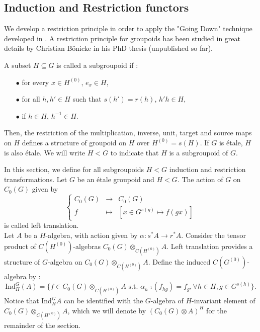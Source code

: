 \subsection{Induction and Restriction functors}

We develop a restriction principle in order to apply the "Going Down" technique developed in \cite{ChabertEOY}. A restriction principle for groupoids has been studied in great details by Christian Bönicke in his PhD thesis (unpublished so far).

\begin{definition} A subset $H\subseteq G$ is called a subgroupoid if :
\begin{itemize}
\item[$\bullet$] for every $x\in H^{(0)}$, $e_x\in H$,
\item[$\bullet$] for all $h,h'\in H $ such that $s(h') = r(h)$, $h'h \in H$,
\item[$\bullet$] if $h\in H$, $h^{-1}\in H$.
\end{itemize}
Then, the restriction of the multiplication, inverse, unit, target and source maps on $H$ defines a structure of groupoid on $H$ over $H^{(0)} = s(H)$. If $G$ is étale, $H$ is also étale. We will write $H< G$ to indicate that $H$ is a subgroupoid of $G$.
\end{definition}

In this section, we define for all subgroupoids $H < G$ induction and restriction transformations. Let $G$ be an étale groupoid and $H<G$. The action of $G$ on $C_0(G)$ given by 
\[\left\{ \begin{array}{rcl}
C_0(G) & \rightarrow & C_0(G) \\
f & \mapsto  & [x\in G^{s(g)}\mapsto f(gx) ]
\end{array}\right.\] 
is called left translation.\\

Let $A$ be a $H$-algebra, with action given by $\alpha : s^*A \rightarrow r^* A$. Consider the tensor product of $C(H^{(0)})$-algebras $C_0(G)\otimes_{C(H^{(0)})} A$. Left translation provides a structure of $G$-algebra on $C_0(G)\otimes_{C(H^{(0)})} A$. Define the induced $C(G^{(0)})$-algebra by :
\[\text{Ind}_H^G (A) = \{f \in C_0(G)\otimes_{C(H^{(0)})} A \text{ s.t. } \alpha_{h^{-1}}(f_{hg}) = f_g,\forall h\in H,g\in G^{s(h)}\}. \]
Notice that $\text{Ind}_H^G A$ can be identified with the $G$-algebra of $H$-invariant element of $C_0(G)\otimes_{C(H^{(0)})} A$, which we will denote by $(C_0(G)\otimes A )^H$ for the remainder of the section.\\

